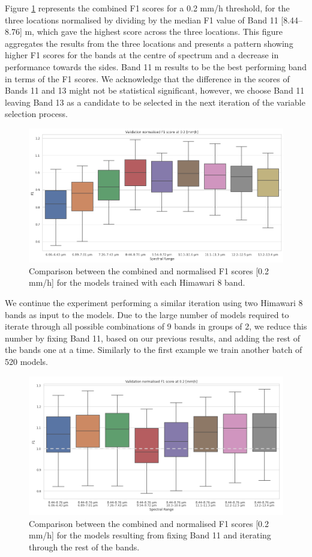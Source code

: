 \documentclass[3p,times]{elsarticle}
\begin{document}
Figure \ref{experiment_1b} represents the combined F1 scores for a 0.2 mm/h threshold, for the three locations normalised by dividing by the median F1 value of Band 11 [8.44–8.76] \textmu m, which gave the highest score across the three locations. This figure aggregates the results from the three locations and presents a pattern showing higher F1 scores for the bands at the centre of spectrum and a decrease in performance towards the sides. Band 11  m results to be the best performing band in terms of the F1 scores. We acknowledge that the difference in the scores of Bands 11 and 13 might not be statistical significant, however, we choose Band 11 leaving Band 13 as a candidate to be selected in the next iteration of the variable selection process. 

\begin{figure}%
    \includegraphics[width=14cm]{figure2.png}
    \caption{Comparison between the combined and normalised F1 scores [0.2 mm/h] for the models trained with each Himawari 8 band.}%
    \label{experiment_1b}%
\end{figure}

We continue the experiment performing a similar iteration using two Himawari 8 bands as input to the models. Due to the large number of models required to iterate through all possible combinations of 9 bands in groups of 2, we reduce this number by fixing Band 11, based on our previous results, and adding the rest of the bands one at a time. Similarly to the first example we train another batch of 520 models.

\begin{figure}%
    \includegraphics[width=14cm]{figure3.png}
    \caption{Comparison between the combined and normalised F1 scores [0.2 mm/h] for the models resulting from fixing Band 11 and iterating through the rest of the bands.}%
    \label{experiment_2}%
\end{figure}
\end{document}
